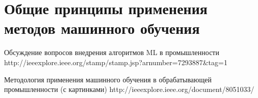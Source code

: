 \chapter{Общие принципы применения методов машинного обучения} \label{chapt4}


Обсуждение вопросов внедрения алгоритмов ML в промышленности
http://ieeexplore.ieee.org/stamp/stamp.jsp?arnumber=7293887&tag=1

Методология применения машинного обучения в обрабатывающей промышленности (с картинками)
http://ieeexplore.ieee.org/document/8051033/